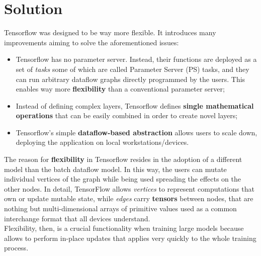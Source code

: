 \documentclass[10pt]{proc}
\begin{document}
\section{Solution}
Tensorflow was designed to be way more flexible. It introduces many improvements aiming to solve the aforementioned issues:

\begin{itemize}
 \item  Tensorflow has no parameter server. Instead, their functions are deployed as a set of \textit{tasks} some of which are called Parameter Server (PS) tasks, and they can run arbitrary dataflow graphs directly programmed by the users. This enables way more \textbf{flexibility} than a conventional parameter server;
 \item Instead of defining complex layers, Tensorflow defines \textbf{single mathematical operations} that can be easily combined in order to create novel layers;
 \item Tensorflow's simple \textbf{dataflow-based abstraction} allows users to scale down, deploying the application on local workstations/devices.
\end{itemize}
  The reason for \textbf{flexibility} in Tensorflow resides in the adoption of a different model than the batch dataflow model.
In this way, the users can mutate individual vertices of the graph while being used spreading the effects on the other nodes. In detail, TensorFlow allows \textit{vertices} to
represent computations that own or update mutable state, while \textit{edges} carry \textbf{tensors} between
nodes, that are nothing but multi-dimensional arrays of primitive values used as a common
interchange format that all devices understand.\\
Flexibility, then, is a crucial functionality when training large models because allows to perform in-place updates that applies very quickly to the whole training process.
\end{document}
